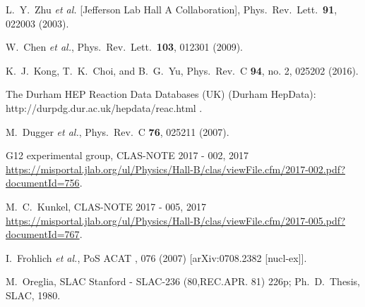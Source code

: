 \documentclass[aps,prc,twocolumn,floatfix,showpacs,preprintnumbers,amsmath,amssymb,superscriptaddress,linenumbers]{revtex4-1}
\begin{document}
\begin{thebibliography}{99}
  L.~Y.~Zhu {\it et al.} [Jefferson Lab Hall A Collaboration],
  Phys.\ Rev.\ Lett.\  {\bf 91}, 022003 (2003).

  W.~Chen {\it et al.},
  Phys.\ Rev.\ Lett.\  {\bf 103}, 012301 (2009).

  K.~J.~Kong, T.~K.~Choi, and B.~G.~Yu,
  Phys.\ Rev.\ C {\bf 94}, no. 2, 025202 (2016).

 The Durham HEP Reaction Data Databases (UK) (Durham 
	HepData): http://durpdg.dur.ac.uk/hepdata/reac.html .

  M.~Dugger {\it et al.},
  Phys.\ Rev.\ C {\bf 76}, 025211 (2007).

 G12 experimental group, CLAS-NOTE 2017 - 002, 2017 
	\url{https://misportal.jlab.org/ul/Physics/Hall-B/clas/viewFile.cfm/2017-002.pdf?documentId=756}.

 M.~C.~Kunkel,  CLAS-NOTE 2017 - 005, 2017 
	\url{https://misportal.jlab.org/ul/Physics/Hall-B/clas/viewFile.cfm/2017-005.pdf?documentId=767}.

 I.~Frohlich {\it et al.}, 
	PoS ACAT {\bf }, 076 (2007) [arXiv:0708.2382 [nucl-ex]].

  M.~Oreglia,
  SLAC Stanford - SLAC-236 (80,REC.APR. 81) 226p; 
  Ph.~D.~Thesis, SLAC, 1980.


\end{thebibliography}
\end{document}
